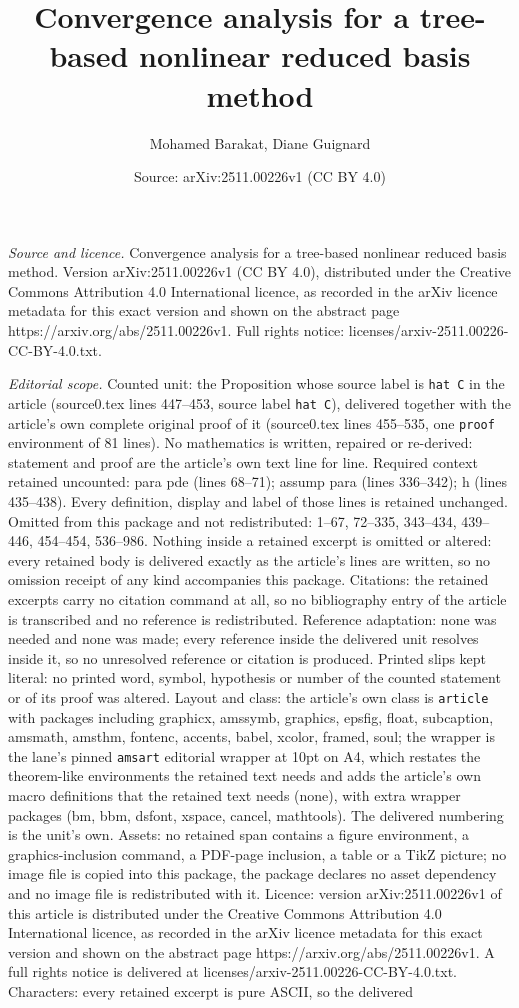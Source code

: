 \documentclass[10pt,a4paper]{amsart}
\title[Convergence analysis for a tree-based nonlinear reduced basi]{Convergence analysis for a tree-based nonlinear reduced basis method}
\author{Mohamed Barakat, Diane Guignard}
\date{Source: arXiv:2511.00226v1 (CC BY 4.0)}
\begin{document}
\maketitle

\noindent\emph{Source and licence.} Convergence analysis for a tree-based nonlinear reduced basis method. Version arXiv:2511.00226v1 (CC BY 4.0), distributed under the Creative Commons Attribution 4.0 International licence, as recorded in the arXiv licence metadata for this exact version and shown on the abstract page https://arxiv.org/abs/2511.00226v1. Full rights notice: licenses/arxiv-2511.00226-CC-BY-4.0.txt.\par\smallskip

\noindent\textit{Editorial scope.} Counted unit: the Proposition whose source label is \texttt{hat C} in the article (source0.tex lines 447--453, source label \texttt{hat C}), delivered together with the article's own complete original proof of it (source0.tex lines 455--535, one \texttt{proof} environment of 81 lines). No mathematics is written, repaired or re-derived: statement and proof are the article's own text line for line. Required context retained uncounted: para pde (lines 68--71); assump para (lines 336--342); h (lines 435--438). Every definition, display and label of those lines is retained unchanged. Omitted from this package and not redistributed: 1--67, 72--335, 343--434, 439--446, 454--454, 536--986. Nothing inside a retained excerpt is omitted or altered: every retained body is delivered exactly as the article's lines are written, so no omission receipt of any kind accompanies this package. Citations: the retained excerpts carry no citation command at all, so no bibliography entry of the article is transcribed and no reference is redistributed. Reference adaptation: none was needed and none was made; every reference inside the delivered unit resolves inside it, so no unresolved reference or citation is produced. Printed slips kept literal: no printed word, symbol, hypothesis or number of the counted statement or of its proof was altered. Layout and class: the article's own class is \texttt{article} with packages including graphicx, amssymb, graphics, epsfig, float, subcaption, amsmath, amsthm, fontenc, accents, babel, xcolor, framed, soul; the wrapper is the lane's pinned \texttt{amsart} editorial wrapper at 10pt on A4, which restates the theorem-like environments the retained text needs and adds the article's own macro definitions that the retained text needs (none), with extra wrapper packages (bm, bbm, dsfont, xspace, cancel, mathtools). The delivered numbering is the unit's own. Assets: no retained span contains a figure environment, a graphics-inclusion command, a PDF-page inclusion, a table or a TikZ picture; no image file is copied into this package, the package declares no asset dependency and no image file is redistributed with it. Licence: version arXiv:2511.00226v1 of this article is distributed under the Creative Commons Attribution 4.0 International licence, as recorded in the arXiv licence metadata for this exact version and shown on the abstract page https://arxiv.org/abs/2511.00226v1. A full rights notice is delivered at licenses/arxiv-2511.00226-CC-BY-4.0.txt. Characters: every retained excerpt is pure ASCII, so the delivered 
\end{document}
